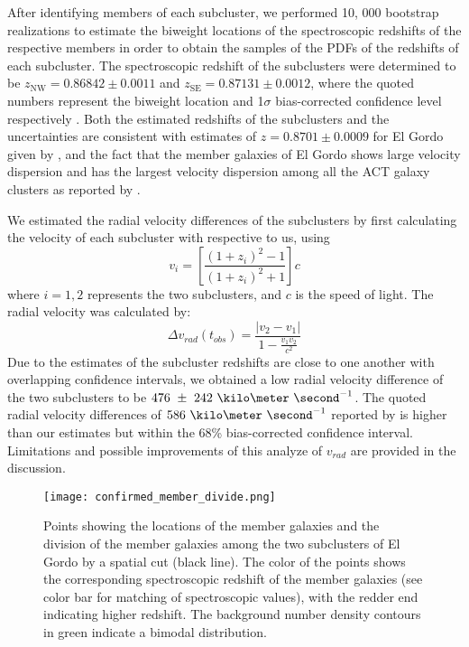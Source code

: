 After identifying members of each subcluster, we performed 10, 000 bootstrap realizations to estimate the biweight
locations of the spectroscopic redshifts of the respective members in order
to obtain the
samples of the PDFs of the redshifts of each subcluster. 
The spectroscopic redshift of the subclusters were
determined to be 
$z_{\mathrm{NW}} = 0.86842 \pm 0.0011$ and 
$z_{\mathrm{SE}} = 0.87131 \pm 0.0012$, where the quoted numbers represent the
biweight location and 1$\sigma$ bias-corrected confidence level
respectively \citep{Beers90}.  
Both the estimated redshifts of the subclusters and the uncertainties are
consistent with estimates of $z=0.8701 \pm 0.0009$ for El Gordo given by \citealt{Sifon13}, and the fact that the
member galaxies of El
Gordo shows large velocity dispersion and has the largest velocity
dispersion among all the ACT galaxy clusters as reported by
.

We estimated the radial velocity differences of the
subclusters by first calculating the velocity of each subcluster with
respective to us, using  
\begin{equation}
	v_i = \left[ \frac{(1+z_i)^2 - 1 }{(1+z_i)^2 + 1 }\right]c
\end{equation}
where $i=1, 2$ represents the two subclusters, and $c$ is the speed of
light. The radial velocity was calculated by: 
\begin{equation}
	\Delta v_{rad}(t_{obs}) = \frac{|v_2 - v_1|}{1-\frac{v_1 v_2}{c^2}}
\end{equation}
Due to the estimates of the subcluster redshifts are close to
one another with overlapping confidence intervals, we obtained a low 
radial velocity difference of the two subclusters to be
$476~\pm~242~\kilo\meter~\second^{-1}$. 
The quoted radial velocity differences of $586~\kilo \meter~\second^{-1}$ reported by  
is higher than our estimates but within the 68\% bias-corrected
confidence interval. Limitations and possible improvements of this analyze
of $v_{rad}$ are provided in the discussion. 

\begin{figure}
	\texttt{[image: confirmed\_member\_divide.png]}
	\caption{\label{fig:membership} Points showing the locations of the
	member galaxies and the division of the member galaxies among the two subclusters of El Gordo by a spatial cut
(black line). The color of the points shows the corresponding spectroscopic
redshift of the member galaxies (see color bar for matching of
spectroscopic values), with the redder end indicating higher
redshift. The background number density contours in green indicate a bimodal
distribution.} 
\end{figure}

